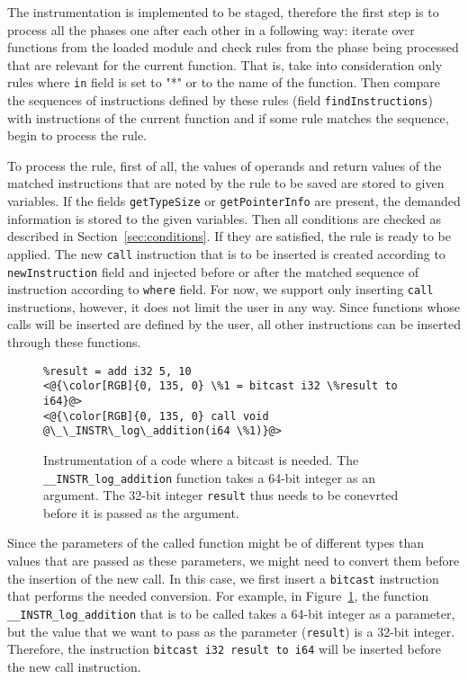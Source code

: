 The instrumentation is implemented to be staged, therefore the first step is to
process all the phases one after each other in a following way: iterate over
functions from the loaded module and check rules from the phase being processed
that are relevant for the current function. That is, take into consideration
only rules where \texttt{in} field is set to "*" or to the name of the
function. Then compare the sequences of instructions defined by these rules
(field \texttt{findInstructions}) with instructions of the current function and
if some rule matches the sequence, begin to process the rule.

To process the rule, first of all, the values of operands and return values of
the matched instructions that are noted by the rule to be saved are stored to
given variables. If the fields \texttt{getTypeSize} or \texttt{getPointerInfo}
are present, the demanded information is stored to the given variables. Then
all conditions are checked as described in Section~\ref{sec:conditions}. If
they are satisfied, the rule is ready to be applied. The new \texttt{call}
instruction that is to be inserted is created according to
\texttt{newInstruction} field and injected before or after the matched sequence
of instruction according to \texttt{where} field. For now, we support only
inserting \texttt{call} instructions, however, it does not limit the user in
any way. Since functions whose calls will be inserted are defined by the user,
all other instructions can be inserted through these functions.

\begin{figure}[h]
\begin{lstlisting}
%result = add i32 5, 10
<@{\color[RGB]{0, 135, 0} \%1 = bitcast i32 \%result to i64}@>
<@{\color[RGB]{0, 135, 0} call void @\_\_INSTR\_log\_addition(i64 \%1)}@>
\end{lstlisting}
\caption{Instrumentation of a code where a bitcast is needed. The
\texttt{\_\_INSTR\_log\_addition} function takes a 64-bit integer as an
argument. The 32-bit integer \texttt{result} thus needs to be conevrted before
it is passed as the argument.}
\label{fig:bitcast_example}
\end{figure}
Since the parameters of the called function might be of different types than
values that are passed as these parameters, we might need to convert them
before the insertion of the new call. In this case, we first insert a
\texttt{bitcast} instruction that performs the needed conversion. For example,
in Figure~\ref{fig:bitcast_example}, the function
\texttt{\_\_INSTR\_log\_addition} that is to be called takes a 64-bit integer
as a parameter, but the value that we want to pass as the parameter
(\texttt{result}) is a 32-bit integer. Therefore, the instruction \texttt{bitcast
i32 result to i64} will be inserted before the new call instruction.

